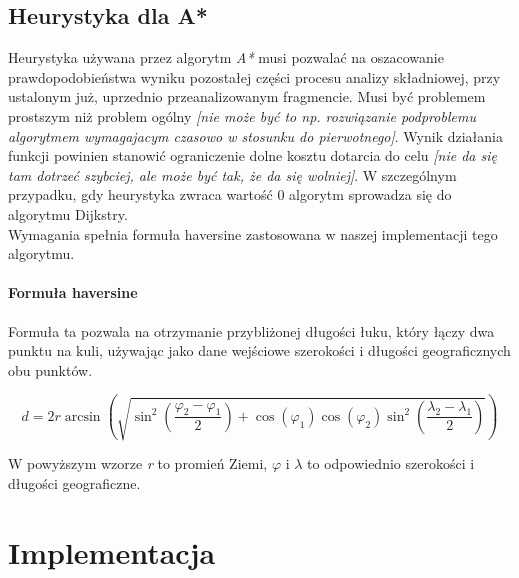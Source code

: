 \documentclass[11pt]{article} %
\begin{document}
\subsection{Heurystyka dla A*}
Heurystyka używana przez algorytm \textsl{A*}  musi pozwalać na oszacowanie prawdopodobieństwa wyniku pozostałej części procesu analizy składniowej, przy ustalonym już, uprzednio przeanalizowanym fragmencie. Musi być problemem prostszym niż problem ogólny \textsl{[nie może być to np. rozwiązanie podproblemu algorytmem wymagajacym czasowo w stosunku do pierwotnego]}. Wynik działania funkcji powinien stanowić ograniczenie dolne kosztu dotarcia do celu \textsl{[nie da się tam dotrzeć szybciej, ale może być tak, że da się wolniej]}. W szczególnym przypadku, gdy heurystyka zwraca wartość 0 algorytm sprowadza się do algorytmu Dijkstry.\\
Wymagania spełnia formuła haversine zastosowana w naszej implementacji tego algorytmu.
\paragraph{Formuła haversine}
Formuła ta pozwala na otrzymanie przybliżonej długości łuku, który łączy dwa punktu na kuli, używając jako dane wejściowe szerokości i długości geograficznych obu punktów.
\begin{center}
\[ d = 2r \arcsin\left(\sqrt{\sin^2\left(\frac{\varphi_2 - \varphi_1}{2}\right) + \cos(\varphi_1) \cos(\varphi_2)\sin^2\left(\frac{\lambda_2 - \lambda_1}{2}\right)}\right) \]
\end{center}
W powyższym wzorze \textsl{r} to promień Ziemi, $\varphi$ i $\lambda$ to odpowiednio szerokości i długości geograficzne.
\section{Implementacja}
\end{document}
